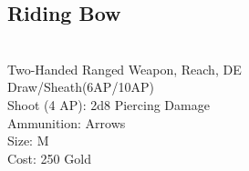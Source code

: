 \subsection{Riding Bow}\label{weapon:ridingBow}\\
Two-Handed Ranged Weapon,  Reach, DE\\
Draw/Sheath(6AP/10AP)\\
Shoot (4 AP): 2d8 Piercing Damage\\
Ammunition: Arrows\\
Size: M\\
Cost: 250 Gold\\